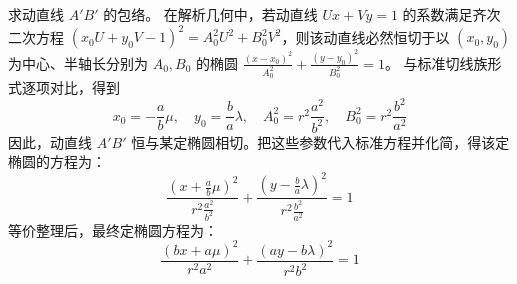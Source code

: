 \begin{solution}
求动直线 $A'B'$ 的包络。
在解析几何中，若动直线 $Ux + Vy = 1$ 的系数满足齐次二次方程 $(x_0 U + y_0 V - 1)^2 = A_0^2 U^2 + B_0^2 V^2$，则该动直线必然恒切于以 $(x_0, y_0)$ 为中心、半轴长分别为 $A_0, B_0$ 的椭圆 $\frac{(x-x_0)^2}{A_0^2} + \frac{(y-y_0)^2}{B_0^2} = 1$。
与标准切线族形式逐项对比，得到
$$ x_0 = -\frac{a}{b}\mu, \quad y_0 = \frac{b}{a}\lambda, \quad A_0^2 = r^2 \frac{a^2}{b^2}, \quad B_0^2 = r^2 \frac{b^2}{a^2} $$
因此，动直线 $A'B'$ 恒与某定椭圆相切。把这些参数代入标准方程并化简，得该定椭圆的方程为：
$$ \frac{\left(x + \frac{a}{b}\mu\right)^2}{r^2 \frac{a^2}{b^2}} + \frac{\left(y - \frac{b}{a}\lambda\right)^2}{r^2 \frac{b^2}{a^2}} = 1 $$
等价整理后，最终定椭圆方程为：
$$ \frac{(bx + a\mu)^2}{r^2 a^2} + \frac{(ay - b\lambda)^2}{r^2 b^2} = 1 $$

\end{solution}

